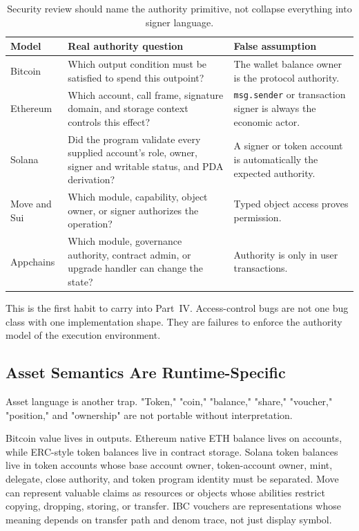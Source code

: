 \begin{table}[htbp]
\centering
\small
\renewcommand{\arraystretch}{1.18}
\begin{tabularx}{\textwidth}{@{}>{\RaggedRight\arraybackslash}p{}>{\RaggedRight\arraybackslash}p{}>{\RaggedRight\arraybackslash}X@{}}
\toprule
Model & Real authority question & False assumption \\
\midrule
Bitcoin & Which output condition must be satisfied to spend this outpoint? & The wallet balance owner is the protocol authority. \\
Ethereum & Which account, call frame, signature domain, and storage context controls this effect? & \texttt{msg.sender} or transaction signer is always the economic actor. \\
Solana & Did the program validate every supplied account's role, owner, signer and writable status, and PDA derivation? & A signer or token account is automatically the expected authority. \\
Move and Sui & Which module, capability, object owner, or signer authorizes the operation? & Typed object access proves permission. \\
Appchains & Which module, governance authority, contract admin, or upgrade handler can change the state? & Authority is only in user transactions. \\
\bottomrule
\end{tabularx}
\caption{Security review should name the authority primitive, not collapse everything into signer language.}
\end{table}

This is the first habit to carry into Part~IV. Access-control bugs are not one bug class with one implementation shape. They are failures to enforce the authority model of the execution environment.

\subsection{Asset Semantics Are Runtime-Specific}

Asset language is another trap. "Token," "coin," "balance," "share," "voucher," "position," and "ownership" are not portable without interpretation.

Bitcoin value lives in outputs. Ethereum native ETH balance lives on accounts, while ERC-style token balances live in contract storage. Solana token balances live in token accounts whose base account owner, token-account owner, mint, delegate, close authority, and token program identity must be separated. Move can represent valuable claims as resources or objects whose abilities restrict copying, dropping, storing, or transfer. IBC vouchers are representations whose meaning depends on transfer path and denom trace, not just display symbol.

